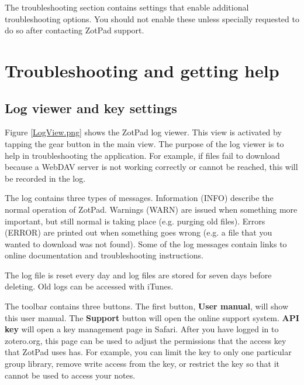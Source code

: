 \documentclass[oneside, openany, 12pt]{tufte-book}
\newcommand{\ipad}[1]{}
\newcommand{\image}[2]{
	\center
	\fbox{\texttt{[image: images/iPhone/\{\#2]}}}

	\caption{#1 \label{#2}}
	\smallskip\noindent\small Figure \ref{#2}: #1
	}
\newcommand{\ipadfootnote}[1]{}
\newcommand{\ipad}[1]{#1}
\newcommand{\image}[2]{
	\caption{#1}
	\label{#2}
	\fbox{\texttt{[image: images/iPad/\{\#2]}}}
	}
\newcommand{\ipadfootnote}[1]{\footnote{#1}}
\begin{document}
The troubleshooting section contains settings that enable additional troubleshooting options. You should not enable these unless specially requested to do so after contacting ZotPad support.

\begin{figure}
\image{Advanced ZotPad settings}{AdvancedSettings.png}
\end{figure}

\chapter{Troubleshooting and getting help}

\section{Log viewer and key settings}

Figure \ref{LogView.png} shows the ZotPad log viewer. This view is activated by tapping the gear button in the main view. The purpose of the log viewer is to help in troubleshooting the application. For example, if files fail to download because a WebDAV server is not working correctly or cannot be reached, this will be recorded in the log.

The log contains three types of messages. Information (INFO) describe the normal operation of ZotPad. Warnings (WARN) are issued when something more important, but still normal is taking place (e.g. purging old files). Errors (ERROR) are printed out when something goes wrong (e.g. a file that you wanted to download was not found). Some of the log messages contain links to online documentation and troubleshooting instructions.

\begin{figure}
\image{ZotPad log viewer}{LogView.png}
\end{figure}

The log file is reset every day and log files are stored for seven days before deleting. Old logs can be accessed with iTunes. 

The toolbar contains three buttons. The first button, \textbf{User manual}, will show this user manual. The \textbf{Support} button will open the online support system\ipadfootnote{ZotPad uses UserVoice for support and knowledge base. UserVoice can be accessed also with a browser\\*\url{http://zotpad.uservoice.com}}. \textbf{\ipad{Manage }API key} will open a key management page in Safari. After you have logged in to zotero.org, this page can be used to adjust the permissions that the access key that ZotPad uses has. For example, you can limit the key to only one particular group library, remove write access from the key, or restrict the key so that it cannot be used to access your notes.
\end{document}
